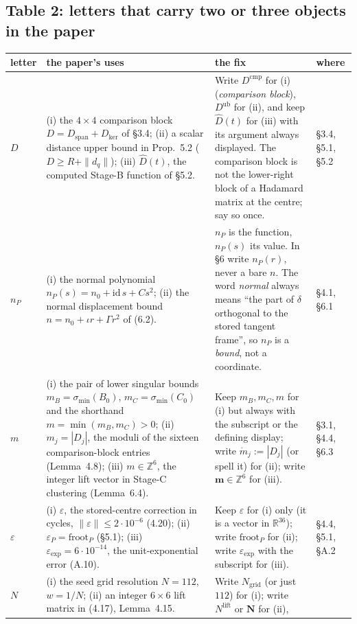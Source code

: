 \documentclass[11pt]{article}
\newcommand{\R}{\mathbb{R}}
\begin{document}
\subsection*{Table 2: letters that carry two or three objects in the paper}

\begin{longtable}{@{}L{1.1cm}L{3.4cm}L{5.6cm}L{2.2cm}@{}}
\hline
letter & the paper's uses & the fix & where \\
\hline
\endhead
$D$ &
(i) the $4\times4$ comparison block $D=D_{\mathrm{span}}+D_{\mathrm{ker}}$ of \S3.4;
(ii) a scalar distance upper bound in Prop.~5.2 ($D\ge R+\|d_q\|$);
(iii) $\hat D(t)$, the computed Stage-B function of \S5.2. &
Write $D^{\mathrm{cmp}}$ for (i) (\emph{comparison block}), $D^{\mathrm{ub}}$ for (ii), and keep
$\hat D(t)$ for (iii) with its argument always displayed. The comparison block is not the lower-right
block of a Hadamard matrix at the centre; say so once. &
\S3.4, \S5.1, \S5.2 \\
$n_P$ &
(i) the normal polynomial $n_P(s)=n_0+\mathrm{id}\,s+Cs^2$;
(ii) the normal displacement bound $n=n_0+\iota r+\Gamma r^2$ of (6.2). &
$n_P$ is the function, $n_P(s)$ its value. In \S6 write $n_P(r)$, never a bare $n$. The word
\emph{normal} always means ``the part of $\delta$ orthogonal to the stored tangent frame'', so
$n_P$ is a \emph{bound}, not a coordinate. &
\S4.1, \S6.1 \\
$m$ &
(i) the pair of lower singular bounds $m_B=\sigma_{\min}(B_0)$, $m_C=\sigma_{\min}(C_0)$ and the
shorthand $m=\min(m_B,m_C)>0$;
(ii) $m_j=|D_j|$, the moduli of the sixteen comparison-block entries (Lemma~4.8);
(iii) $m\in\mathbb{Z}^6$, the integer lift vector in Stage-C clustering (Lemma~6.4). &
Keep $m_B,m_C,m$ for (i) but always with the subscript or the defining display;
write $\dot m_j := |D_j|$ (or spell it) for (ii); write $\mathbf{m}\in\mathbb{Z}^6$ for (iii). &
\S3.1, \S4.4, \S6.3 \\
$\varepsilon$ &
(i) $\varepsilon$, the stored-centre correction in cycles, $\|\varepsilon\|\le2\cdot10^{-6}$ (4.20);
(ii) $\varepsilon_P=\mathrm{froot}_P$ (\S5.1);
(iii) $\varepsilon_{\exp}=6\cdot10^{-14}$, the unit-exponential error (A.10). &
Keep $\varepsilon$ for (i) only (it is a vector in $\R^{36}$); write $\mathrm{froot}_P$ for (ii);
write $\varepsilon_{\exp}$ with the subscript for (iii). &
\S4.4, \S5.1, \S A.2 \\
$N$ &
(i) the seed grid resolution $N=112$, $w=1/N$;
(ii) an integer $6\times6$ lift matrix in (4.17), Lemma~4.15. &
Write $N_{\mathrm{grid}}$ (or just $112$) for (i); write $N^{\mathrm{lift}}$ or $\mathbf{N}$ for (ii),

\end{longtable}
\end{document}
